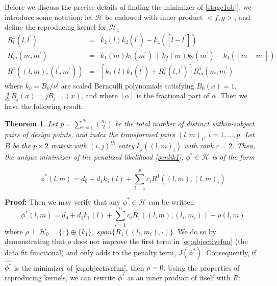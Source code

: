 \documentclass[12pt]{article}
\newtheorem{theorem}{Theorem}[section]
\theoremstyle{definition}
\begin{document}
Before we discuss the precise details of finding the minimizer of \eqref{stage1obj}, we introduce some notation: let $\mathcal{H}$ be endowed with inner product $\big < f,g\big >$, and define the reproducing kernel for $\mathcal{H}_1$  
\begin{eqnarray} \nonumber
R_l^1\left(l,l^\prime\right) &=& k_2\left(l \right)k_2\left(l^\prime \right) - k_{4}\left(\left[ l-l^\prime \right] \right)\\ \nonumber
R_m^1\left(m,m^\prime\right) &=& k_1\left(m \right)k_1\left(m^\prime \right) + k_2\left(m \right)k_2\left(m^\prime \right) - k_{4}\left(\left[ m-m^\prime \right] \right)\\
R^1\left(\left(l,m\right),\left(l^\prime,m^\prime\right)  \right) &=& \left[k_1\left(l\right)k_1\left(l^\prime \right) +  R_l^1\left(l,l^\prime\right)\right] R_m^1\left(m,m^\prime\right) \label{TPRK}
\end{eqnarray}
where $k_\nu = B_\nu/\nu!$ are scaled Bernoulli polynomials satisfying $B_0\left(x\right) = 1$, $\frac{d}{dx} B_j\left(x\right) = jB_{j-1}\left(x\right)$, and where $\left[ \alpha \right]$ is the fractional part of $\alpha$. Then we have the following result:

\begin{theorem}
Let $p= \sum_{i=1}^N {n_i \choose 2}$ be the total number of distinct within-subject pairs of design points, and index the transformed pairs $\left( l,m \right)_i$, $i=1, \dots,p$. Let $B$ be the $p \times 2$ matrix with $\left(i,j\right)^{th}$ entry $k_j\left( \left( l,m \right)_i \right)$ with rank $r=2$. Then, the unique minimizer of the penalized likelihood \eqref{penlik1}, $\phi^* \in \mathcal{H}$ is of the form

\begin{equation}
\phi^*\left(l,m\right) = d_0 + d_1 k_1\left(l\right) + \sum_{i=1}^{p} c_i R^1\left( \left(l,m\right) , \left(l,m \right)_i\right)
 \label{eq:finitedimsolution}
\end{equation}
\end{theorem}

{\bf Proof:}
Then we may verify that any $\phi^* \in \mathcal{H}$ can be written 
\[
\phi^*\left(l,m \right) = d_0 + d_1k_1\left(l\right) + \sum_{i=1}^n  c_i R_1\left( \left(l,m\right) , \left(l_i,m_i \right)\right) + \rho\left(l,m\right)
\]
\noindent
where $\rho \perp \mathcal{H}_0 = \lbrace 1\rbrace \oplus \lbrace k_1\rbrace,\; span\lbrace R_1\left(\left(l_i, m_i \right),\cdot \right)  \rbrace$. We do so by demonstrating that  $\rho$ does not improve the first term in \eqref{eq:objectivefun} (the data fit functional) and only adds to the penalty term, $J\left(\phi^*\right)$. Consequently, if $\hat{\phi^*}$ is the minimizer of \eqref{eq:objectivefun}, then $\rho = 0$. Using the properties of reproducing kernels, we can rewrite $\phi^*$ as an inner product of itself with $R$:
 
\end{document}
